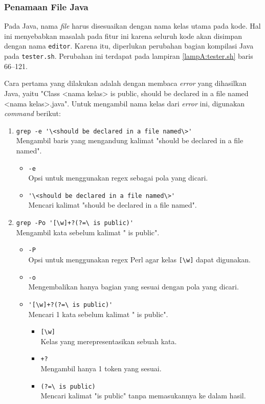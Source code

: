 \subsubsection{Penamaan File Java}

Pada Java, nama \textit{file} harus disesuaikan dengan nama kelas utama pada kode. Hal ini menyebabkan masalah pada fitur ini karena seluruh kode akan disimpan dengan nama \verb|editor|. Karena itu, diperlukan perubahan bagian kompilasi Java pada \verb|tester.sh|. Perubahan ini terdapat pada lampiran \ref{lampA:tester.sh} baris 66--121. 

Cara pertama yang dilakukan adalah dengan membaca \textit{error} yang dihasilkan Java, yaitu "Class <nama kelas> is public, should be declared in a file named <nama kelas>.java". Untuk mengambil nama kelas dari \textit{error} ini, digunakan \textit{command} berikut:
\begin{enumerate}
    \item \verb|grep -e '\<should be declared in a file named\>'| \\ Mengambil baris yang mengandung kalimat "should be declared in a file named".
    \begin{itemize}
        \item \verb|-e| \\ Opsi untuk menggunakan regex sebagai pola yang dicari.
        \item \verb|'\<should be declared in a file named\>'| \\ Mencari kalimat "should be declared in a file named".
    \end{itemize}
    \item \verb|grep -Po '[\w]+?(?=\ is public)'| \\ Mengambil kata sebelum kalimat " is public".
    \begin{itemize}
        \item \verb|-P| \\ Opsi untuk menggunakan regex Perl agar kelas \verb|[\w]| dapat digunakan.
        \item \verb|-o| \\ Mengembalikan hanya bagian yang sesuai dengan pola yang dicari.
        \item \verb|'[\w]+?(?=\ is public)'| \\ Mencari 1 kata sebelum kalimat " is public".
        \begin{itemize}
            \item \verb|[\w]| \\ Kelas yang merepresentasikan sebuah kata.
            \item \verb|+?| \\ Mengambil hanya 1 token yang sesuai.
            \item \verb|(?=\ is public)| \\ Mencari kalimat "is public" tanpa memasukannya ke dalam hasil.
        \end{itemize}
    \end{itemize}
\end{enumerate}

